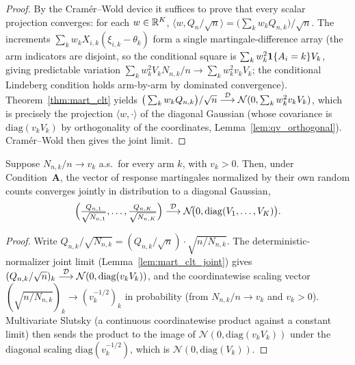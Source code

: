 \begin{proof}\leanok
{}
By the Cramér--Wold device it suffices to prove that every scalar projection converges: for each
$w\in\mathbb{R}^K$, $\langle w, Q_n/\sqrt n\rangle = \big(\sum_k w_k Q_{n,k}\big)/\sqrt n$. The increments
$\sum_k w_k X_{i,k}(\xi_{i,k}-\theta_k)$ form a single martingale-difference array (the arm indicators
are disjoint, so the conditional square is $\sum_k w_k^2\mathbf{1}\{A_i=k\}V_k$, giving predictable
variation $\sum_k w_k^2 V_k N_{n,k}/n\to\sum_k w_k^2 v_kV_k$; the conditional Lindeberg condition
holds arm-by-arm by dominated convergence). Theorem~\ref{thm:mart_clt} yields
$\big(\sum_k w_k Q_{n,k}\big)/\sqrt n\overset{\mathcal{D}}{\longrightarrow}\mathcal N(0,\sum_k w_k^2 v_kV_k)$, which is precisely the
projection $\langle w,\cdot\rangle$ of the diagonal Gaussian (whose covariance is
$\mathrm{diag}(v_kV_k)$ by orthogonality of the coordinates, Lemma~\ref{lem:qv_orthogonal}). Cramér--Wold
then gives the joint limit.
\end{proof}

\begin{lemma}\label{lem:mart_clt_joint_selfnorm}
\leanok
{}
Suppose $N_{n,k}/n\to v_k$ a.s.\ for every arm $k$, with $v_k>0$. Then, under
Condition~\textbf{A}, the vector of response martingales normalized by their own random counts
converges jointly in distribution to a diagonal Gaussian,
\[
  \Big(\tfrac{Q_{n,1}}{\sqrt{N_{n,1}}},\dots,\tfrac{Q_{n,K}}{\sqrt{N_{n,K}}}\Big)
    \overset{\mathcal{D}}{\longrightarrow} \mathcal N\!\big(0, \mathrm{diag}(V_1,\dots,V_K)\big).
\]
\end{lemma}

\begin{proof}\leanok
{}
Write $Q_{n,k}/\sqrt{N_{n,k}}=(Q_{n,k}/\sqrt n)\cdot\sqrt{n/N_{n,k}}$. The deterministic-normalizer
joint limit (Lemma~\ref{lem:mart_clt_joint}) gives
$(Q_{n,k}/\sqrt n)_k\overset{\mathcal{D}}{\longrightarrow}\mathcal N(0,\mathrm{diag}(v_kV_k))$, and the coordinatewise scaling
vector $(\sqrt{n/N_{n,k}})_k\to(v_k^{-1/2})_k$ in probability (from $N_{n,k}/n\to v_k$ and
$v_k>0$). Multivariate Slutsky (a continuous coordinatewise product against a constant limit) then
sends the product to the image of $\mathcal N(0,\mathrm{diag}(v_kV_k))$ under the diagonal scaling
$\mathrm{diag}(v_k^{-1/2})$, which is $\mathcal N(0,\mathrm{diag}(V_k))$.
\end{proof}

